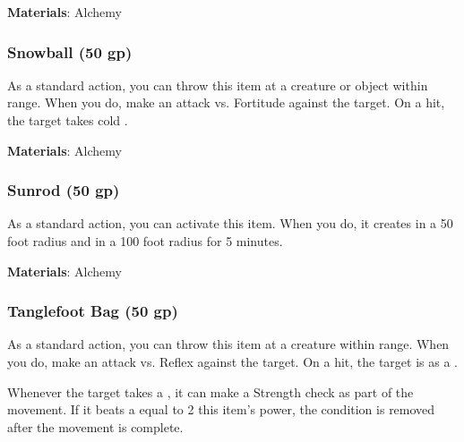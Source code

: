 \vspace{0.25em}
\textbf{Materials}: Alchemy


\lowercase{\hypertarget{item:Snowball}{}}\label{item:Snowball}
\hypertarget{item:Snowball}{\subsubsection{Snowball\hfill{} (50 gp)}}

As a standard action, you can throw this item at a creature or object within \rngclose range.
When you do, make an attack vs. Fortitude against the target.
On a hit, the target takes cold .



\vspace{0.25em}
\textbf{Materials}: Alchemy


\lowercase{\hypertarget{item:Sunrod}{}}\label{item:Sunrod}
\hypertarget{item:Sunrod}{\subsubsection{Sunrod\hfill{} (50 gp)}}

As a standard action, you can activate this item.
When you do, it creates  in a 50 foot radius and  in a 100 foot radius for 5 minutes.



\vspace{0.25em}
\textbf{Materials}: Alchemy


\lowercase{\hypertarget{item:Tanglefoot Bag}{}}\label{item:Tanglefoot Bag}
\hypertarget{item:Tanglefoot Bag}{\subsubsection{Tanglefoot Bag\hfill{} (50 gp)}}

As a standard action, you can throw this item at a creature within \rngclose range.
When you do, make an attack vs. Reflex against the target.
On a hit, the target is  as a .

Whenever the target takes a , it can make a Strength check as part of the movement.
If it beats a  equal to 2 \add this item's power, the condition is removed after the movement is complete.



